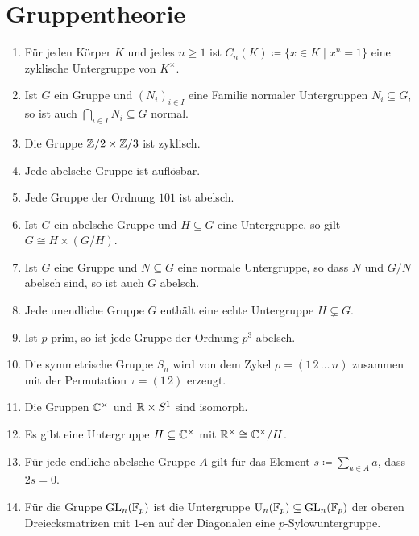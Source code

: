 \section{Gruppentheorie}


\begin{question}[subtitle = Wahr oder Falsch?]
  \begin{enumerate}
    \item
      Für jeden Körper $K$ und jedes $n \geq 1$ ist $C_n(K) \coloneqq \{x \in K \mid x^n = 1\}$ eine zyklische Untergruppe von $K^\times$.
    \item
      Ist $G$ ein Gruppe und $(N_i)_{i \in I}$ eine Familie normaler Untergruppen $N_i \subseteq G$, so ist auch $\bigcap_{i \in I} N_i \subseteq G$ normal.
    \item
      Die Gruppe $\mathbb{Z}/2 \times \mathbb{Z}/3$ ist zyklisch.
    \item
      Jede abelsche Gruppe ist auflösbar.
    \item
      Jede Gruppe der Ordnung $101$ ist abelsch.
    \item
      Ist $G$ ein abelsche Gruppe und $H \subseteq G$ eine Untergruppe, so gilt $G \cong H \times (G/H)$.
    \item
      Ist $G$ eine Gruppe und $N \subseteq G$ eine normale Untergruppe, so dass $N$ und $G/N$ abelsch sind, so ist auch $G$ abelsch.
    \item
      Jede unendliche Gruppe $G$ enthält eine echte Untergruppe $H \subsetneq G$.
    \item
      Ist $p$ prim, so ist jede Gruppe der Ordnung $p^3$ abelsch.
    \item
      Die symmetrische Gruppe $S_n$ wird von dem Zykel $\rho = (1 \, 2 \, \dotso \, n)$ zusammen mit der Permutation $\tau = (1 \, 2)$ erzeugt.
    \item
      Die Gruppen $\mathbb{C}^\times$ und $\mathbb{R} \times S^1$ sind isomorph.
    \item
      Es gibt eine Untergruppe $H \subseteq \mathbb{C}^\times$ mit $\mathbb{R}^\times \cong \mathbb{C}^\times/H$.
    \item
      Für jede endliche abelsche Gruppe $A$ gilt für das Element $s \coloneqq \sum_{a \in A} a$, dass $2 s = 0$.
    \item
      Für die Gruppe $\operatorname{GL}_n(\mathbb{F}_p)$ ist die Untergruppe $\operatorname{U}_n(\mathbb{F}_p) \subseteq \operatorname{GL}_n(\mathbb{F}_p)$ der oberen Dreiecksmatrizen mit $1$-en auf der Diagonalen eine $p$-Sylowuntergruppe.
  \end{enumerate}
\end{question}


